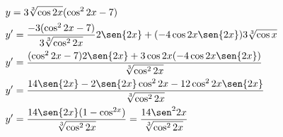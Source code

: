 \begin{ex}
\begin{align}
&y=3\sqrt[3]{\cos{2x}}(\cos^2{2x}-7)\nonumber\\
&y'=\frac{-3(\cos^2{2x}-7)}{3\sqrt[3]{\cos^2{2x}}}2\sen{2x}+(-4\cos{2x}\sen{2x})3\sqrt[3]{\cos{x}}\nonumber\\
&y'=\frac{(\cos^2{2x}-7)2\sen{2x}+3\cos{2x}(-4\cos{2x}\sen{2x})}{\sqrt[3]{\cos^2{2x}}}\nonumber\\
&y'=\frac{14\sen{2x}-2\sen{2x}\cos^2{2x}-12\cos^2{2x}\sen{2x}}{\sqrt[3]{\cos^2{2x}}}\nonumber\\
&y'=\frac{14\sen{2x}(1-\cos^{2x})}{\sqrt[3]{\cos^2{2x}}}=\frac{14\sen^2{2x}}{\sqrt[3]{\cos^2{2x}}}\nonumber
\end{align}
\end{ex}